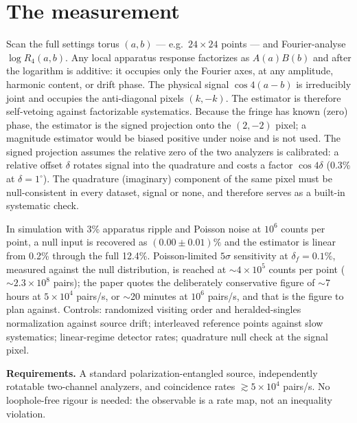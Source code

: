 \documentclass[11pt]{article}
\begin{document}
\section*{The measurement}
Scan the full settings torus $(a,b)$ --- e.g.\ $24\times 24$ points --- and Fourier-analyse $\log R_4(a,b)$. Any local apparatus response factorizes as $A(a)B(b)$ and after the logarithm is additive: it occupies only the Fourier axes, at any amplitude, harmonic content, or drift phase. The physical signal $\cos 4(a-b)$ is irreducibly joint and occupies the anti-diagonal pixels $(k,-k)$. The estimator is therefore self-vetoing against factorizable systematics. Because the fringe has known (zero) phase, the estimator is the signed projection onto the $(2,-2)$ pixel; a magnitude estimator would be biased positive under noise and is not used. The signed projection assumes the relative zero of the two analyzers is calibrated: a relative offset $\delta$ rotates signal into the quadrature and costs a factor $\cos 4\delta$ (0.3\% at $\delta = 1^\circ$). The quadrature (imaginary) component of the same pixel must be null-consistent in every dataset, signal or none, and therefore serves as a built-in systematic check.

In simulation with 3\% apparatus ripple and Poisson noise at $10^6$ counts per point, a null input is recovered as $(0.00\pm 0.01)\%$ and the estimator is linear from 0.2\% through the full 12.4\%. Poisson-limited $5\sigma$ sensitivity at $\delta_f=0.1\%$, measured against the null distribution, is reached at $\sim 4\times 10^5$ counts per point ($\sim 2.3\times10^8$ pairs); the paper quotes the deliberately conservative figure of $\sim$7 hours at $5\times10^4$ pairs/s, or $\sim$20 minutes at $10^6$ pairs/s, and that is the figure to plan against. Controls: randomized visiting order and heralded-singles normalization against source drift; interleaved reference points against slow systematics; linear-regime detector rates; quadrature null check at the signal pixel.

\textbf{Requirements.} A standard polarization-entangled source, independently rotatable two-channel analyzers, and coincidence rates $\gtrsim 5\times 10^4$ pairs/s. No loophole-free rigour is needed: the observable is a rate map, not an inequality violation.
\end{document}
